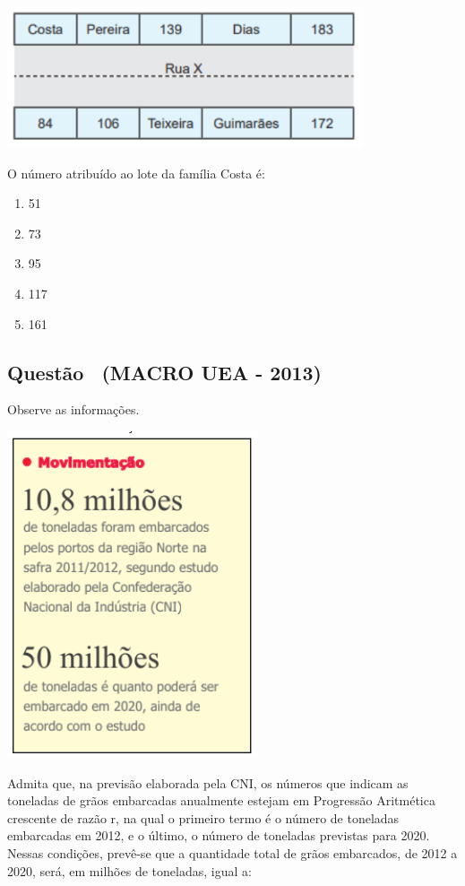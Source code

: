 \documentclass[12pt]{article}
\newcounter{questao}
\newcommand{\novaquestao}[1]{%
  \stepcounter{questao}%
  \subsection*{Questão \thequestao\ (#1)}%
}
\begin{document}
\begin{multicols}{2}
            \begin{center}
                \includegraphics[scale=0.6]{q27.png}
            \end{center}O número atribuído ao lote da família Costa é:
        
            \begin{enumerate}[label=(\alph*), noitemsep]
                \item 51
                \item 73
                \item 95
                \item 117
                \item 161
            \end{enumerate}

        \novaquestao{MACRO UEA - 2013}
            Observe as informações.
            
            \begin{center}
                \includegraphics[scale=0.7]{q28.png}
            \end{center}Admita que, na previsão elaborada pela CNI, os números que indicam as toneladas de grãos embarcadas anualmente estejam em Progressão Aritmética crescente de razão r, na qual o primeiro termo é o número de toneladas embarcadas em 2012, e o último, o número de toneladas previstas para 2020. Nessas condições, prevê-se que a quantidade total de grãos embarcados, de 2012 a 2020, será, em milhões de toneladas, igual a:
            

\end{multicols}
\end{document}
